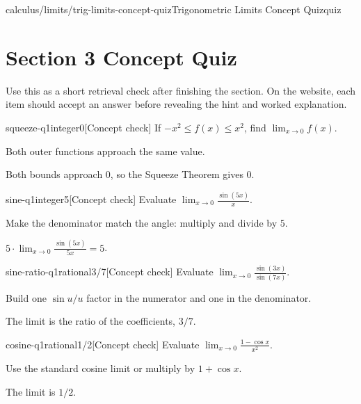 \begin{webpage}{calculus/limits/trig-limits-concept-quiz}{Trigonometric Limits Concept Quiz}{quiz}
\section*{Section 3 Concept Quiz}

Use this as a short retrieval check after finishing the section. On the website, each item should accept an answer before revealing the hint and worked explanation.

\begin{bgcheck}{squeeze-q1}{integer}{0}[Concept check]
If \(-x^2\le f(x)\le x^2\), find \(\lim_{x\to0}f(x)\).
\begin{bghint}
Both outer functions approach the same value.
\end{bghint}
\begin{bgreveal}
Both bounds approach \(0\), so the Squeeze Theorem gives \(0\).
\end{bgreveal}
\end{bgcheck}

\begin{bgcheck}{sine-q1}{integer}{5}[Concept check]
Evaluate \(\lim_{x\to0}\frac{\sin(5x)}{x}\).
\begin{bghint}
Make the denominator match the angle: multiply and divide by \(5\).
\end{bghint}
\begin{bgreveal}
\(5\cdot\lim_{x\to0}\frac{\sin(5x)}{5x}=5\).
\end{bgreveal}
\end{bgcheck}

\begin{bgcheck}{sine-ratio-q1}{rational}{3/7}[Concept check]
Evaluate \(\lim_{x\to0}\frac{\sin(3x)}{\sin(7x)}\).
\begin{bghint}
Build one \(\sin u/u\) factor in the numerator and one in the denominator.
\end{bghint}
\begin{bgreveal}
The limit is the ratio of the coefficients, \(3/7\).
\end{bgreveal}
\end{bgcheck}

\begin{bgcheck}{cosine-q1}{rational}{1/2}[Concept check]
Evaluate \(\lim_{x\to0}\frac{1-\cos x}{x^2}\).
\begin{bghint}
Use the standard cosine limit or multiply by \(1+\cos x\).
\end{bghint}
\begin{bgreveal}
The limit is \(1/2\).
\end{bgreveal}
\end{bgcheck}


\end{webpage}
